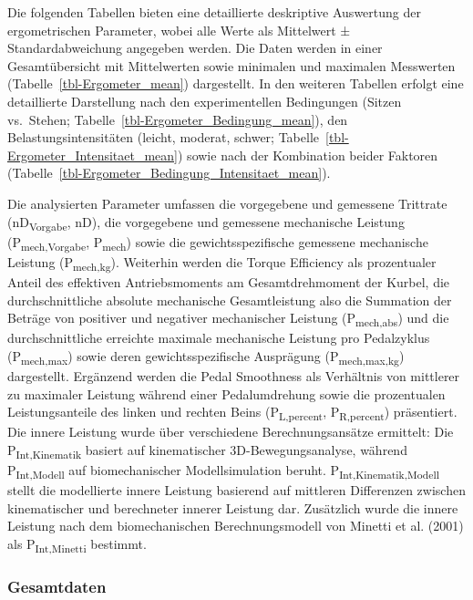 \documentclass[
  letterpaper,
  DIV=11]{scrartcl}
\begin{document}
Die folgenden Tabellen bieten eine detaillierte deskriptive Auswertung
der ergometrischen Parameter, wobei alle Werte als Mittelwert ±
Standardabweichung angegeben werden. Die Daten werden in einer
Gesamtübersicht mit Mittelwerten sowie minimalen und maximalen
Messwerten (Tabelle~\ref{tbl-Ergometer_mean}) dargestellt. In den
weiteren Tabellen erfolgt eine detaillierte Darstellung nach den
experimentellen Bedingungen (Sitzen vs.~Stehen;
Tabelle~\ref{tbl-Ergometer_Bedingung_mean}), den Belastungsintensitäten
(leicht, moderat, schwer; Tabelle~\ref{tbl-Ergometer_Intensitaet_mean})
sowie nach der Kombination beider Faktoren
(Tabelle~\ref{tbl-Ergometer_Bedingung_Intensitaet_mean}).

Die analysierten Parameter umfassen die vorgegebene und gemessene
Trittrate (nD\textsubscript{Vorgabe}, nD), die vorgegebene und gemessene
mechanische Leistung (P\textsubscript{mech,Vorgabe},
P\textsubscript{mech}) sowie die gewichtsspezifische gemessene
mechanische Leistung (P\textsubscript{mech,kg}). Weiterhin werden die
Torque Efficiency als prozentualer Anteil des effektiven Antriebsmoments
am Gesamtdrehmoment der Kurbel, die durchschnittliche absolute
mechanische Gesamtleistung also die Summation der Beträge von positiver
und negativer mechanischer Leistung (P\textsubscript{mech,abs}) und die
durchschnittliche erreichte maximale mechanische Leistung pro
Pedalzyklus (P\textsubscript{mech,max}) sowie deren gewichtsspezifische
Ausprägung (P\textsubscript{mech,max,kg}) dargestellt. Ergänzend werden
die Pedal Smoothness als Verhältnis von mittlerer zu maximaler Leistung
während einer Pedalumdrehung sowie die prozentualen Leistungsanteile des
linken und rechten Beins (P\textsubscript{L,percent},
P\textsubscript{R,percent}) präsentiert. Die innere Leistung wurde über
verschiedene Berechnungsansätze ermittelt: Die
P\textsubscript{Int,Kinematik} basiert auf kinematischer
3D-Bewegungsanalyse, während P\textsubscript{Int,Modell} auf
biomechanischer Modellsimulation beruht.
P\textsubscript{Int,Kinematik,Modell} stellt die modellierte innere
Leistung basierend auf mittleren Differenzen zwischen kinematischer und
berechneter innerer Leistung dar. Zusätzlich wurde die innere Leistung
nach dem biomechanischen Berechnungsmodell von Minetti et al. (2001) als
P\textsubscript{Int,Minetti} bestimmt.

\subsubsection{Gesamtdaten}
\end{document}

